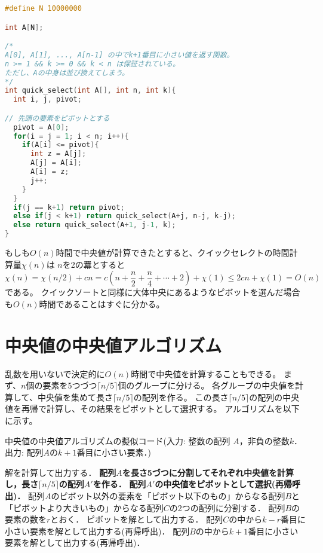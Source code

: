 \documentclass[a4paper,twoside,onecolumn,openany,article,10pt]{memoir}
\theoremstyle{remark}
\begin{document}
\begin{lstlisting}[basicstyle=\ttfamily\normalsize,showstringspaces=false,language=C,frame=single]
#define N 10000000

int A[N];

/*
A[0], A[1], ..., A[n-1] の中でk+1番目に小さい値を返す関数。
n >= 1 && k >= 0 && k < n は保証されている。
ただし、Aの中身は並び換えてしまう。
*/
int quick_select(int A[], int n, int k){
  int i, j, pivot;

// 先頭の要素をピボットとする
  pivot = A[0];
  for(i = j = 1; i < n; i++){
    if(A[i] <= pivot){
      int z = A[j];
      A[j] = A[i];
      A[i] = z;
      j++;
    }
  }
  if(j == k+1) return pivot;
  else if(j < k+1) return quick_select(A+j, n-j, k-j);
  else return quick_select(A+1, j-1, k);
}
\end{lstlisting}

もしも$O(n)$時間で中央値が計算できたとすると、クイックセレクトの時間計算量$\chi(n)$は
$n$を2の羃とすると
\begin{equation*}
\chi(n) = \chi(n/2) + cn = c\left(n+\frac{n}2 + \frac{n}4 + \dotsb + 2\right) + \chi(1) \le 2c n + \chi(1) = O(n)
\end{equation*}
である。
クイックソートと同様に大体中央にあるようなピボットを選んだ場合も$O(n)$時間であることはすぐに分かる。


\section{中央値の中央値アルゴリズム}
乱数を用いないで決定的に$O(n)$時間で中央値を計算することもできる。
まず、$n$個の要素を5つづつ$\lceil n/5\rceil$個のグループに分ける。
各グループの中央値を計算して、中央値を集めて長さ$\lceil n/5\rceil$の配列を作る。
この長さ$\lceil n/5\rceil$の配列の中央値を再帰で計算し、その結果をピボットとして選択する。
アルゴリズムを以下に示す。


\begin{algorithm}
\caption{中央値の中央値アルゴリズムの擬似コード(入力: 整数の配列 $A$，非負の整数$k$．出力: 配列$A$の$k+1$番目に小さい要素．)}
\label{alg:qselectl}
\begin{algorithmic}
  \State 解を計算して出力する．
\Else
  \State \textbf{配列$A$を長さ5づつに分割してそれぞれ中央値を計算し，長さ$\lceil n/5\rceil$の配列$A'$を作る．}
  \State \textbf{配列$A'$の中央値をピボットとして選択(再帰呼出)．}
  \State 配列$A$のピボット以外の要素を「ピボット以下のもの」からなる配列$B$と「ピボットより大きいもの」からなる配列$C$の2つの配列に分割する．
  \State 配列$B$の要素の数を$r$とおく．
    \State ピボットを解として出力する．
    \State 配列$C$の中から$k-r$番目に小さい要素を解として出力する(再帰呼出)．
  \Else
    \State 配列$B$の中から$k+1$番目に小さい要素を解として出力する(再帰呼出)．
  \EndIf
\EndIf
\end{algorithmic}
\end{algorithm}
\end{document}
